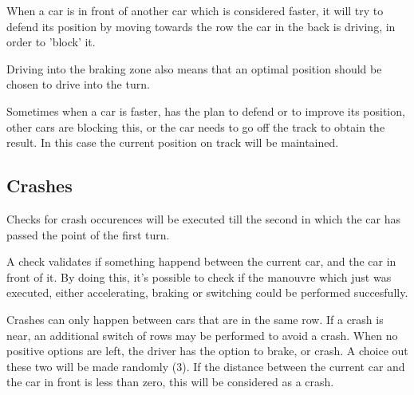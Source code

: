 When a car is in front of another car which is considered faster, it will try to defend its position by moving towards the row the car in the back is driving, in order to 'block' it.

Driving into the braking zone also means that an optimal position should be chosen to drive into the turn.

Sometimes when a car is faster, has the plan to defend or to improve its position, other cars are blocking this, or the car needs to go off the track to obtain the result. In this case the current position on track will be maintained.

\subsection{Crashes}
Checks for crash occurences will be executed till the second in which the car has passed the point of the first turn.

A check validates if something happend between the current car, and the car in front of it. By doing this, it's possible to check if the manouvre which just was executed, either accelerating, braking or switching could be performed succesfully.

Crashes can only happen between cars that are in the same row. If a crash is near, an additional switch of rows may be performed to avoid a crash. When no positive options are left, the driver has the option to brake, or crash. A choice out these two will be made randomly (3). If the distance between the current car and the car in front is less than zero, this will be considered as a crash.
